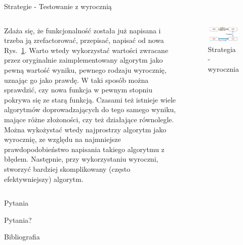\documentclass[polish,aspectratio=169]{beamer}
\newcommand{\refrys}[1]{Rys.~\ref{#1}}
\begin{document}
\begin{frame}{Strategie - Testowanie z wyrocznią}
    \begin{columns}[t]
            Zdaża się, że funkcjonalność została już napisana i trzeba ją zrefactorować, przepisać, napisać od nowa \refrys{fig:oracle_strategy}. Warto wtedy wykorzystać wartości zwracane przez oryginalnie zaimplementowany algorytm jako pewną wartość wyniku, pewnego rodzaju wyrocznię, uznając go jako prawdę. 
            W taki sposób można sprawdzić, czy nowa funkcja w pewnym stopniu pokrywa się ze starą funkcją. Czasami też istnieje wiele algorytmów doprowadzających do tego samego wyniku, mające różne złożoności, czy też działające równolegle. 
            Można wykożystać wtedy najprostrzy algorytm jako wyrocznię, ze względu na najmniejsze prawdopodobieństwo napisania takiego algorytmu z błędem. Następnie, przy wykorzystaniu wyroczni, stworzyć bardziej skomplikowany (często efektywniejszy) algorytm.
        \centering
        \begin{figure}
            \centering
            \includegraphics[width=1\textwidth]{images/property_test_oracle.png}
            \caption{Strategia - wyrocznia}
            \label{fig:oracle_strategy}
        \end{figure}    
    \end{columns}
\end{frame}

\begin{frame}{Pytania}
    \begin{center}
        {\huge Pytania?}
    \end{center}
\end{frame}

\begin{frame}[allowframebreaks]{Bibliografia}
    \printbibliography
\end{frame}
\end{document}
